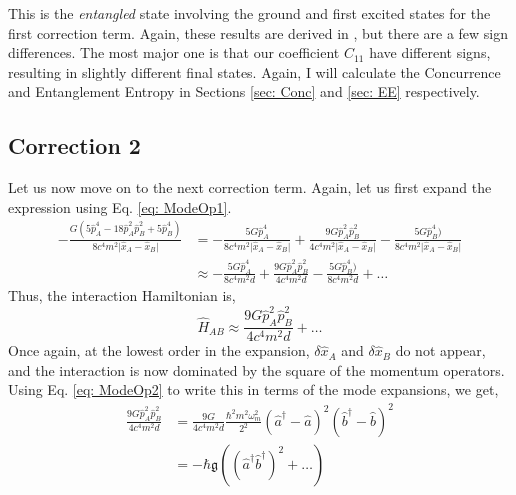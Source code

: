 \documentclass[12pt,a4paper]{report}
\theoremstyle{plain}
\theoremstyle{definition}
\theoremstyle{remark}
\renewcommand{\dag}{\dagger}
\newcommand{\Hab}{\hat{H}_{AB}}
\newcommand{\ahat}{\hat{a}}
\newcommand{\bhat}{\hat{b}}
\newcommand{\g}{\mathfrak{g}}
\begin{document}
This is the \textit{entangled} state involving the ground and first excited states for the first correction term. Again, these results are derived in \citet{Bose_2022}, but there are a few sign differences. The most major one is that our coefficient $C_{11}$ have different signs, resulting in slightly different final states. Again, I will calculate the Concurrence and Entanglement Entropy in Sections \ref{sec: Conc} and \ref{sec: EE} respectively.

\subsection{Correction 2}
Let us now move on to the next correction term. Again, let us first expand the expression using Eq. \ref{eq: ModeOp1}.
\begin{equation}
    \begin{aligned}
        -\frac{G(5{\hat{p}}_{A}^{4}-18{\hat{p}}_{A}^{2}{\hat{p}}_{B}^{2}+5{\hat{p}}_{B}^{4})}{8c^{4}m^{2}\vert{\hat{x}}_{A}-{\hat{x}}_{B}\vert} &= -\frac{5G{\hat{p}}_{A}^{4}}{8c^{4}m^{2}\vert{\hat{x}}_{A}-{\hat{x}}_{B}\vert} + \frac{9G{\hat{p}}_{A}^{2}{\hat{p}}_{B}^{2}}{4c^{4}m^{2}\vert{\hat{x}}_{A}-{\hat{x}}_{B}\vert} - \frac{5G{\hat{p}}_{B}^{4})}{8c^{4}m^{2}\vert{\hat{x}}_{A}-{\hat{x}}_{B}\vert}\\
        &\approx -\frac{5G{\hat{p}}_{A}^{4}}{8c^{4}m^{2}d} + \frac{9G{\hat{p}}_{A}^{2}{\hat{p}}_{B}^{2}}{4c^{4}m^{2}d} - \frac{5G{\hat{p}}_{B}^{4})}{8c^{4}m^{2}d} + \ldots
    \end{aligned}
\end{equation}
Thus, the interaction Hamiltonian is,
\begin{equation}
    \Hab \approx \frac{9G{\hat{p}}_{A}^{2}{\hat{p}}_{B}^{2}}{4c^{4}m^{2}d} + \ldots
\end{equation}
Once again, at the lowest order in the expansion, $\delta\hat{x}_{A}$ and $\delta\hat{x}_{B}$ do not appear, and the interaction is now dominated by the square of the momentum operators. Using Eq. \ref{eq: ModeOp2} to write this in terms of the mode expansions, we get,
\begin{equation}
    \begin{aligned}
        \frac{9G{\hat{p}}_{A}^{2}{\hat{p}}_{B}^{2}}{4c^{4}m^{2}d} &=  \frac{9G}{4c^{4}m^{2}d} \frac{\hbar^2 m^2 \omega_m^2}{2^2}(\ahat^{\dag} - \ahat)^2(\bhat^{\dag} - \bhat)^2 \\
        &= -\hbar\g((\ahat^{\dag}\bhat^{\dag})^2 + \ldots)
    \end{aligned}
\end{equation}
\end{document}
